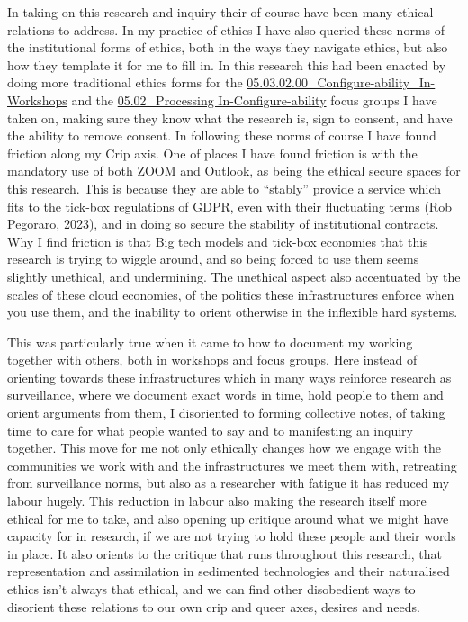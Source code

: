 In taking on this research and inquiry their of course have been many
ethical relations to address. In my practice of ethics I have also
queried these norms of the institutional forms of ethics, both in the
ways they navigate ethics, but also how they template it for me to fill
in. In this research this had been enacted by doing more traditional
ethics forms for the
\href{../../05_In-Configure-Ability/sections/05.03.02.00_Configure-ability_In-Workshops.md}{05.03.02.00\_Configure-ability\_In-Workshops}
and the
\href{../../05_In-Configure-Ability/sections/05.02_Processing\%20In-Configure-ability.md}{05.02\_Processing
In-Configure-ability} focus groups I have taken on, making sure they
know what the research is, sign to consent, and have the ability to
remove consent. In following these norms of course I have found friction
along my Crip axis. One of places I have found friction is with the
mandatory use of both ZOOM and Outlook, as being the ethical secure
spaces for this research. This is because they are able to ``stably''
provide a service which fits to the tick-box regulations of GDPR, even
with their fluctuating terms (Rob Pegoraro, 2023), and in doing so
secure the stability of institutional contracts. Why I find friction is
that Big tech models and tick-box economies that this research is trying
to wiggle around, and so being forced to use them seems slightly
unethical, and undermining. The unethical aspect also accentuated by the
scales of these cloud economies, of the politics these infrastructures
enforce when you use them, and the inability to orient otherwise in the
inflexible hard systems.

This was particularly true when it came to how to document my working
together with others, both in workshops and focus groups. Here instead
of orienting towards these infrastructures which in many ways reinforce
research as surveillance, where we document exact words in time, hold
people to them and orient arguments from them, I disoriented to forming
collective notes, of taking time to care for what people wanted to say
and to manifesting an inquiry together. This move for me not only
ethically changes how we engage with the communities we work with and
the infrastructures we meet them with, retreating from surveillance
norms, but also as a researcher with fatigue it has reduced my labour
hugely. This reduction in labour also making the research itself more
ethical for me to take, and also opening up critique around what we
might have capacity for in research, if we are not trying to hold these
people and their words in place. It also orients to the critique that
runs throughout this research, that representation and assimilation in
sedimented technologies and their naturalised ethics isn't always that
ethical, and we can find other disobedient ways to disorient these
relations to our own crip and queer axes, desires and needs.


